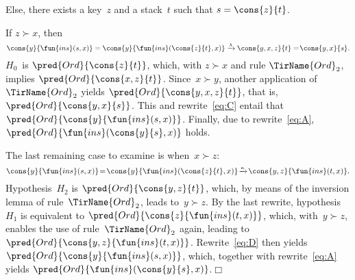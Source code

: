\begin{itemize*}
\begin{itemize*}
\begin{itemize*}
          \item Else, there exists a key~\(z\) and a stack~\(t\) such
            that \(s = \cons{z}{t}\).
            \begin{itemize*}

              \item If \(z \succ x\), then
                \begin{equation}
                  \cons{y}{\fun{ins}(s,x)} =
                  \cons{y}{\fun{ins}(\cons{z}{t},x)}
                  \xrightarrow{\smash{\lambda}} \cons{y,x,z}{t} =\!
                  \cons{y,x}{s}.\label{eq:C}
                \end{equation}
                \(H_0\)~is \(\pred{Ord}{\cons{z}{t}}\), which, with
                \(z \succ x\) and rule \(\TirName{Ord}_2\), implies
                \(\pred{Ord}{\cons{x,z}{t}}\). Since~\(x \succ\! y\),
                another application of~\(\TirName{Ord}_2\) yields
                \(\pred{Ord}{\cons{y,x,z}{t}}\), that is,
                \(\pred{Ord}{\cons{y,x}{s}}\). This and
                rewrite~\eqref{eq:C} entail that
                \(\pred{Ord}{\cons{y}{\fun{ins}(s,x)}}\). Finally, due
                to rewrite~\eqref{eq:A},
                \(\pred{Ord}{\fun{ins}(\cons{y}{s},x)}\) holds.

              \item The last remaining case to examine is when~\(x
                \succ z\):
                \begin{equation}
                  \cons{y}{\fun{ins}(s,x)} \!=\!
                  \cons{y}{\fun{ins}(\cons{z}{t},x)}
                  \!\xrightarrow{\smash{\kappa}}\!
                  \cons{y,z}{\fun{ins}(t,x)}.\label{eq:D}
                \end{equation}
                Hypothesis~\(H_2\) is \(\pred{Ord}{\cons{y,z}{t}}\),
                which, by means of the inversion lemma of
                rule~\(\TirName{Ord}_2\), leads to~\(y \succ z\). By
                the last rewrite, hypothesis~\(H_1\) is equivalent to
                \(\pred{Ord}{\cons{z}{\fun{ins}(t,x)}}\), which,
                with~\(y \succ z\), enables the use of
                rule~\(\TirName{Ord}_2\) again, leading to
                \(\pred{Ord}{\cons{y,z}{\fun{ins}(t,x)}}\).
                Rewrite~\eqref{eq:D} then yields
                \(\pred{Ord}{\cons{y}{\fun{ins}(s,x)}}\), which,
                together with rewrite~\eqref{eq:A} yields
                \(\pred{Ord}{\fun{ins}(\cons{y}{s},x)}\).\hfill\(\Box\)

      \end{itemize*}
    \end{itemize*}
  \end{itemize*}
\end{itemize*}

